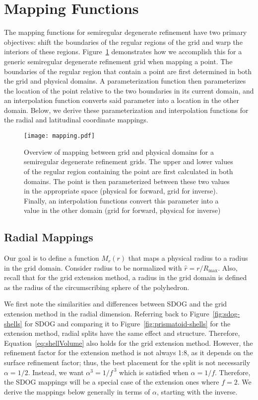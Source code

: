 \section{Mapping Functions} \label{chap:6:functions}
The mapping functions for semiregular degenerate refinement have two primary objectives: shift the boundaries of the regular regions of the grid and warp the interiors of these regions.
Figure~\ref{fig:mapping} demonstrates how we accomplish this for a generic semiregular degenerate refinement grid when mapping a point.
The boundaries of the regular region that contain a point are first determined in both the grid and physical domains.
A parameterization function then parameterizes the location of the point relative to the two boundaries in its current domain, and an interpolation function converts said parameter into a location in the other domain.
Below, we derive these parameterization and interpolation functions for the radial and latitudinal coordinate mappings.


\begin{figure}[ht!]
	\centering
	\texttt{[image: mapping.pdf]}
	\caption[Overview of mapping for semiregular degenerate refinement grids]{
		Overview of mapping between grid and physical domains for a semiregular degenerate refinement grids.
		The upper and lower values of the regular region containing the point are first calculated in both domains.
		The point is then parameterized between these two values in the appropriate space (physical for forward, grid for inverse).
		Finally, an interpolation functions convert this parameter into a value in the other domain (grid for forward, physical for inverse)
	}
	\label{fig:mapping}
\end{figure}


\subsection{Radial Mappings} \label{chap:6:radial}
Our goal is to define a function $M_r(r)$ that maps a physical radius to a radius in the grid domain.
Consider radius to be normalized with $\hat{r} = r / R_\mathrm{max}$.
Also, recall that for the grid extension method, a radius in the grid domain is defined as the radius of the circumscribing sphere of the polyhedron.


We first note the similarities and differences between SDOG and the grid extension method in the radial dimension.
Referring back to Figure~\ref{fig:sdog-shells} for SDOG and comparing it to Figure~\ref{fig:prismatoid-shells} for the extension method, radial splits have the same effect and structure.
Therefore, Equation~\ref{eq:shellVolume} also holds for the grid extension method.
However, the refinement factor for the extension method is not always 1:8, as it depends on the surface refinement factor; thus, the best placement for the split is not necessarily $\alpha = 1/2$.
Instead, we want $\alpha^3 = 1 / f^{\ 3}$ which is satisfied when $\alpha = 1/f$.
Therefore, the SDOG mappings will be a special case of the extension ones where $f = 2$.
We derive the mappings below generally in terms of $\alpha$, starting with the inverse.


